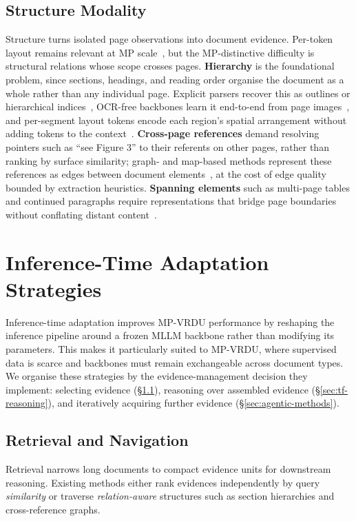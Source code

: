 \documentclass[11pt]{article}
\begin{document}
\subsection{Structure Modality}

\label{sec:modality-structure}
Structure turns isolated page observations into document evidence. Per-token layout remains relevant at MP scale~\cite{zhu2025laytokenllm}, but the MP-distinctive difficulty is structural relations whose scope crosses pages. \textbf{Hierarchy} is the foundational problem, since sections, headings, and reading order organise the document as a whole rather than any individual page. Explicit parsers recover this as outlines or hierarchical indices~\cite{shin2025multidocfusion, sun2025docagent, fu2026dmap}, OCR-free backbones learn it end-to-end from page images~\cite{hu2025mplug2}, and per-segment layout tokens encode each region's spatial arrangement without adding tokens to the context~\cite{zhu2025laytokenllm}. \textbf{Cross-page references} demand resolving pointers such as ``see Figure 3'' to their referents on other pages, rather than ranking by surface similarity; graph- and map-based methods represent these references as edges between document elements~\cite{wu2025molorag, fu2026dmap}, at the cost of edge quality bounded by extraction heuristics. \textbf{Spanning elements} such as multi-page tables and continued paragraphs require representations that bridge page boundaries without conflating distant content~\cite{gong2025mhier, qian2026accurate}.

\section{Inference-Time Adaptation Strategies}
\label{sec:inference-time}
Inference-time adaptation improves MP-VRDU performance by reshaping the inference pipeline around a frozen MLLM backbone rather than modifying its parameters. This makes it particularly suited to MP-VRDU, where supervised data is scarce and backbones must remain exchangeable across document types. We organise these strategies by the evidence-management decision they implement: selecting evidence (\S\ref{sec:tf-retrieval}), reasoning over assembled evidence (\S\ref{sec:tf-reasoning}), and iteratively acquiring further evidence (\S\ref{sec:agentic-methods}).

\subsection{Retrieval and Navigation}
\label{sec:tf-retrieval}
Retrieval narrows long documents to compact evidence units for downstream reasoning. Existing methods either rank evidences independently by query \textit{similarity} or traverse \textit{relation-aware} structures such as section hierarchies and cross-reference graphs.
\end{document}
